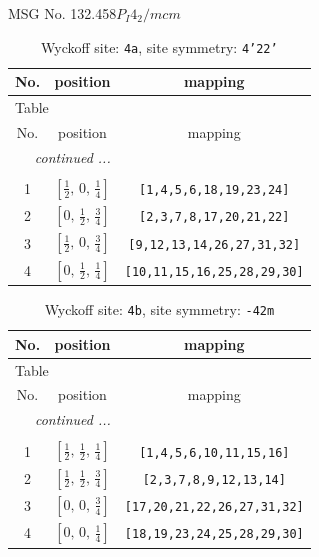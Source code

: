 \documentclass[fleqn,8pt]{jsarticle}
\begin{document}
\setcounter{MaxMatrixCols}{32}

\renewcommand{\tablename}{Table~}
\renewcommand{\figurename}{Figure~}
\begin{center}
\LARGE
MSG No. 132.458\quad$P_{I}4_{2}/mcm$
\end{center}
\renewcommand{\arraystretch}{1.2}
\begin{longtable}{ccc}
\caption{Wyckoff site: {\tt 4a}, site symmetry: {\tt 4'22'}}
 \\
 \hline \hline
No. & position & mapping \\ \hline \endfirsthead

\multicolumn{2}{l}{\tablename\ \thetable{}} \\
 \hline \hline
No. & position & mapping \\ \hline \endhead

 \hline \hline
\multicolumn{2}{r}{\footnotesize\it continued ...} \\ \endfoot

 \hline \hline
\multicolumn{2}{r}{} \\ \endlastfoot

1 & $\left[ \frac{1}{2},\, 0,\, \frac{1}{4} \right]$ & {\tt [1,4,5,6,18,19,23,24]} \\ \hline
2 & $\left[ 0,\, \frac{1}{2},\, \frac{3}{4} \right]$ & {\tt [2,3,7,8,17,20,21,22]} \\ \hline
3 & $\left[ \frac{1}{2},\, 0,\, \frac{3}{4} \right]$ & {\tt [9,12,13,14,26,27,31,32]} \\ \hline
4 & $\left[ 0,\, \frac{1}{2},\, \frac{1}{4} \right]$ & {\tt [10,11,15,16,25,28,29,30]} \\
\end{longtable}
\renewcommand{\arraystretch}{1.2}
\begin{longtable}{ccc}
\caption{Wyckoff site: {\tt 4b}, site symmetry: {\tt -42m}}
 \\
 \hline \hline
No. & position & mapping \\ \hline \endfirsthead

\multicolumn{2}{l}{\tablename\ \thetable{}} \\
 \hline \hline
No. & position & mapping \\ \hline \endhead

 \hline \hline
\multicolumn{2}{r}{\footnotesize\it continued ...} \\ \endfoot

 \hline \hline
\multicolumn{2}{r}{} \\ \endlastfoot

1 & $\left[ \frac{1}{2},\, \frac{1}{2},\, \frac{1}{4} \right]$ & {\tt [1,4,5,6,10,11,15,16]} \\ \hline
2 & $\left[ \frac{1}{2},\, \frac{1}{2},\, \frac{3}{4} \right]$ & {\tt [2,3,7,8,9,12,13,14]} \\ \hline
3 & $\left[ 0,\, 0,\, \frac{3}{4} \right]$ & {\tt [17,20,21,22,26,27,31,32]} \\ \hline
4 & $\left[ 0,\, 0,\, \frac{1}{4} \right]$ & {\tt [18,19,23,24,25,28,29,30]} \\
\end{longtable}
\end{document}
